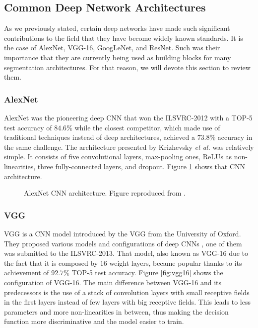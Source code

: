 \subsection{Common Deep Network Architectures}

As we previously stated, certain deep networks have made such significant contributions to the field that they have become widely known standards. It is the case of AlexNet, \acs{VGG}-16, GoogLeNet, and ResNet. Such was their importance that they are currently being used as building blocks for many segmentation architectures. For that reason, we will devote this section to review them.

\subsubsection{AlexNet}

AlexNet was the pioneering deep \acs{CNN} that won the \acs{ILSVRC}-2012 with a TOP-5 test accuracy of $84.6\%$ while the closest competitor, which made use of traditional techniques instead of deep architectures, achieved a $73.8\%$ accuracy in the same challenge. The architecture presented by Krizhevsky \emph{et al.} \cite{Krizhevsky2012} was relatively simple. It consists of five convolutional layers, max-pooling ones, \acp{ReLU} as non-linearities, three fully-connected layers, and dropout. Figure \ref{fig:alexnet} shows that \acs{CNN} architecture.

\begin{figure}[!hbt]
	\centering
	\caption{AlexNet \acl{CNN} architecture. Figure reproduced from \cite{Krizhevsky2012}.}
	\label{fig:alexnet}
\end{figure}

\subsubsection{\acs{VGG}}

\ac{VGG} is a \ac{CNN} model introduced by the \acf{VGG} from the University of Oxford. They proposed various models and configurations of deep \acp{CNN} \cite{Simonyan2014}, one of them was submitted to the \ac{ILSVRC}-2013. That model, also known as \acs{VGG}-16 due to the fact that it is composed by $16$ weight layers, became popular thanks to its achievement of $92.7\%$ TOP-5 test accuracy. Figure \ref{fig:vgg16} shows the configuration of \acs{VGG}-16. The main difference between \acs{VGG}-16 and its predecessors is the use of a stack of convolution layers with small receptive fields in the first layers instead of few layers with big receptive fields. This leads to less parameters and more non-linearities in between, thus making the decision function more discriminative and the model easier to train.

